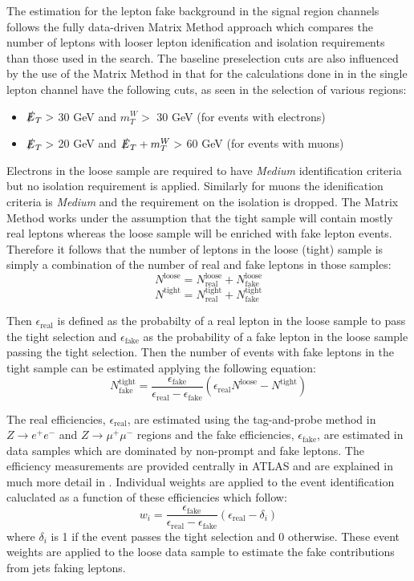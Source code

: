The estimation for the lepton fake background in the signal region channels follows the fully data-driven Matrix Method\cite{MatrixMethod} approach which compares the number of leptons with looser lepton idenification and isolation requirements than those used in the search. The baseline preselection cuts are also influenced by the use of the Matrix Method in that for the calculations done in \cite{MatrixMethod} in the single lepton channel have the following cuts, as seen in the selection of various regions:
\begin{itemize}
\item $\slashed{E}_T >$ 30 GeV and $m_T^W >$ 30 GeV (for events with electrons)
\item $\slashed{E}_T >$ 20 GeV and $\slashed{E}_T + m_T^W >$ 60 GeV (for events with muons)
\end{itemize}
Electrons in the loose sample are required to have \textit{Medium} identification criteria but no isolation requirement is applied.  Similarly for muons the idenification criteria is \textit{Medium} and the requirement on the isolation is dropped.  The Matrix Method works under the assumption that the tight sample will contain mostly real leptons whereas the loose sample will be enriched with fake lepton events.  Therefore it follows that the number of leptons in the loose (tight) sample is simply a combination of the number of real and fake leptons in those samples:
\[
N^{\text{loose}} = N^{\text{loose}}_\text{real} +N^{\text{loose}}_\text{fake} \]
\[
N^{\text{tight}} = N^{\text{tight}}_\text{real} +N^{\text{tight}}_\text{fake} \]

Then $\epsilon_\text{real}$ is defined as the probabilty of a real lepton in the loose sample to pass the tight selection and $\epsilon_\text{fake}$ as the probability of a fake lepton in the loose sample passing the tight selection.  Then the number of events with fake leptons in the tight sample can be estimated applying the following equation:
\[  N_\text{fake}^\text{tight} = \frac{\epsilon_\text{fake}}{\epsilon_\text{real}-\epsilon_\text{fake}}(\epsilon_\text{real} N^\text{loose} -N^\text{tight})
\]

The real efficiencies, $\epsilon_\text{real}$, are estimated using the tag-and-probe method in $Z\rightarrow e^+ e^-$ and $Z\rightarrow \mu^+ \mu^-$ regions and the fake efficiencies, $\epsilon_\text{fake}$, are estimated in data samples which are dominated by non-prompt and fake leptons.  The efficiency measurements are provided centrally in ATLAS and are explained in much more detail in \cite{MatrixMethod}.  Individual weights are applied to the event identification caluclated as a function of these efficiencies which follow:
\[ w_i = \frac{\epsilon_\text{fake}}{\epsilon_\text{real}-\epsilon_\text{fake}}(\epsilon_\text{real}-\delta_i) \]
where $\delta_i$ is 1 if the event passes the tight selection and 0 otherwise.  These event weights are applied to the loose data sample to estimate the fake contributions from jets faking leptons.

